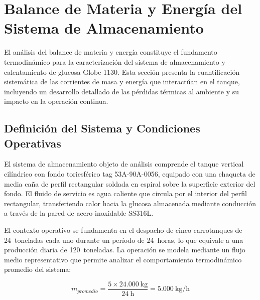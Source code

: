 
\section{Balance de Materia y Energ\'{i}a del Sistema de Almacenamiento}

El an\'alisis del balance de materia y energ\'ia constituye el fundamento termodin\'amico para la caracterizaci\'on del sistema de almacenamiento y calentamiento de glucosa Globe 1130. Esta secci\'on presenta la cuantificaci\'on sistem\'atica de las corrientes de masa y energ\'ia que interact\'uan en el tanque, incluyendo un desarrollo detallado de las p\'erdidas t\'ermicas al ambiente y su impacto en la operaci\'on continua.

\subsection{Definici\'on del Sistema y Condiciones Operativas}

El sistema de almacenamiento objeto de an\'alisis comprende el tanque vertical cil\'indrico con fondo toriesf\'erico tag 53A-90A-0056, equipado con una chaqueta de media ca\~na de perfil rectangular soldada en espiral sobre la superficie exterior del fondo. El fluido de servicio es agua caliente que circula por el interior del perfil rectangular, transferiendo calor hacia la glucosa almacenada mediante conducci\'on a trav\'es de la pared de acero inoxidable SS316L.

El contexto operativo se fundamenta en el despacho de cinco carrotanques de 24~toneladas cada uno durante un per\'iodo de 24~horas, lo que equivale a una producci\'on diaria de 120~toneladas. La operaci\'on se modela mediante un flujo medio representativo que permite analizar el comportamiento termodin\'amico promedio del sistema:

\begin{equation}
\dot{m}_{promedio} = \frac{5 \times 24{.}000~\text{kg}}{24~\text{h}} = 5{.}000~\text{kg/h}
\label{eq:flujo_promedio}
\end{equation}


